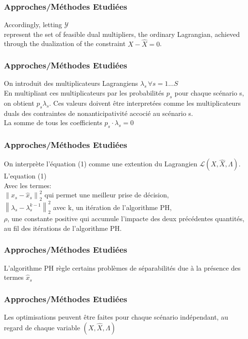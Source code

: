 \documentclass[10pt]{beamer}
\newcommand{\Lagr}{\mathcal{L}}
\newcommand\norm[1]{\left\lVert#1\right\rVert}
\begin{document}
    \begin{frame}
        \frametitle{Approches/Méthodes Etudiées}
        Accordingly, letting $\mathcal{Y}$\\ %
        represent the set of feasible dual multipliers, the ordinary Lagrangian, achieved through the dualization
of the constraint $X - \hat{X} = 0$.
    \end{frame}
    
    
    \begin{frame}
        \frametitle{Approches/Méthodes Etudiées}
        On introduit des multiplicateurs Lagrangiens $\lambda_s \, \forall s = 1 \ldots S$\\
        En multipliant ces multiplicateurs par les probabilités $p_s$ pour chaque scénario s, on obtient $p_s\lambda_s$. Ces valeurs doivent être interpretées comme les multiplicateurs duals des contraintes de nonanticipativité accocié au scénario s.\\
        La somme de tous les coefficients $p_s\cdot\lambda_s = 0$
    \end{frame}
    
    \begin{frame}
        \frametitle{Approches/Méthodes Etudiées}
        On interprète l'équation (1) comme une extention du Lagrangien $\Lagr(X, \hat{X}, \Lambda)$.\\
        L'equation (1)\\
        Avec les termes:\\
        $\norm{x_s - \hat{x}_s}^{2}_{2}$ qui permet une meilleur prise de décision,\\
        $\norm{\lambda_s - \lambda^{k-1}_{s}}^{2}_{2}$ avec k, un itération de l'algorithme PH,\\
        $\rho$, une constante positive qui accumule l'impacte des deux précédentes quantités, au fil des itérations de l'algorithme PH.
    \end{frame}
    
    \begin{frame}
        \frametitle{Approches/Méthodes Etudiées}
        L'algorithme PH règle certains problèmes de séparabilités due à la présence des termes $\hat{x}_s$
    \end{frame}
    
    \begin{frame}
        \frametitle{Approches/Méthodes Etudiées}
        Les optimisations peuvent être faites pour chaque scénario indépendant, au regard de chaque variable $(X, \hat{X}, \Lambda)$
    \end{frame}
    
\end{document}
